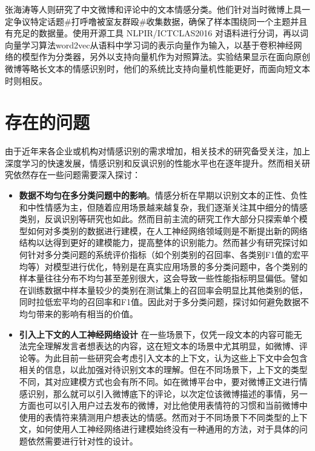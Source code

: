 张海涛等人\cite{zhang2018jiyu}则研究了中文微博和评论中的文本情感分类。他们针对当时微博上具一定争议特定话题\#打呼噜被室友群殴\#收集数据，确保了样本围绕同一个主题并且有充足的数据量。使用开源工具 NLPIR/ICTCLAS2016 对语料进行分词，再以词向量学习算法word2vec从语料中学习词的表示向量作为输入，以基于卷积神经网络的模型作为分类器，另外以支持向量机作为对照算法。实验结果显示在面向原创微博等略长文本的情感识别时，他们的系统比支持向量机性能更好，而面向短文本时则相反。

\section{存在的问题}

由于近年来各企业或机构对情感识别的需求增加，相关技术的研究备受关注，加上深度学习的快速发展，情感识别和反讽识别的性能水平也在逐年提升。然而相关研究依然存在一些问题需要深入探讨：

\begin{itemize}

\item {\bf 数据不均匀在多分类问题中的影响}。情感分析在早期以识别文本的正性、负性和中性情感为主，但随着应用场景越来越复杂，我们逐渐关注其中细分的情感类别，反讽识别等研究也如此。然而目前主流的研究工作大部分只探索单个模型如何对多类别的数据进行建模，在人工神经网络领域则是不断提出新的网络结构以达得到更好的建模能力，提高整体的识别能力。然而甚少有研究探讨如何针对多分类问题的系统评价指标（如个别类别的召回率、各类别F1值的宏平均等）对模型进行优化，特别是在真实应用场景的多分类问题中，各个类别的样本量往往分布不均匀甚至差别很大，这会导致一些性能指标明显偏低。譬如在训练数据中样本量较少的类别在测试集上的召回率会明显比其他类别的低，同时拉低宏平均的召回率和F1值。因此对于多分类问题，探讨如何避免数据不均匀带来的影响有相当的价值。

\item {\bf 引入上下文的人工神经网络设计} 在一些场景下，仅凭一段文本的内容可能无法完全理解发言者想表达的内容，这在短文本的场景中尤其明显，如微博、评论等。为此目前一些研究会考虑引入文本的上下文，认为这些上下文中会包含相关的信息，以此加强对待识别文本的理解。但在不同场景下，上下文的类型不同，其对应建模方式也会有所不同。如在微博平台中，要对微博正文进行情感识别，那么就可以引入微博底下的评论，以次定位该微博描述的事情，另一方面也可以引入用户过去发布的微博，对比他使用表情符的习惯和当前微博中使用的表情符来猜测用户想表达的情感。然而对于不同场景下不同类型的上下文，如何使用人工神经网络进行建模始终没有一种通用的方法，对于具体的问题依然需要进行针对性的设计。

\end{itemize}

